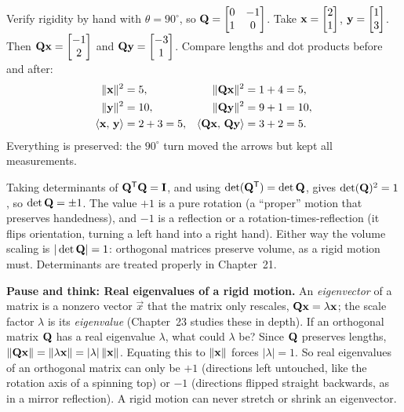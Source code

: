 \begin{labbox}
Verify rigidity by hand with $\theta=90^\circ$, so $\mathbf{Q}=\begin{bmatrix}0&-1\\1&0\end{bmatrix}$.
Take $\mathbf{x}=\begin{bmatrix}2\\1\end{bmatrix}$, $\mathbf{y}=\begin{bmatrix}1\\3\end{bmatrix}$. Then $\mathbf{Q}\mathbf{x}=\begin{bmatrix}-1\\2\end{bmatrix}$ and
$\mathbf{Q}\mathbf{y}=\begin{bmatrix}-3\\1\end{bmatrix}$. Compare lengths and dot products before and after:
\begin{align*}
  \lVert\mathbf{x}\rVert^2 &= 5, & \lVert\mathbf{Q}\mathbf{x}\rVert^2 &= 1+4 = 5,\\
  \lVert\mathbf{y}\rVert^2 &= 10, & \lVert\mathbf{Q}\mathbf{y}\rVert^2 &= 9+1 = 10,\\
  \langle \mathbf{x},\, \mathbf{y} \rangle &= 2+3 = 5, & \langle \mathbf{Q}\mathbf{x},\, \mathbf{Q}\mathbf{y} \rangle &= 3+2 = 5.
\end{align*}
Everything is preserved: the $90^\circ$ turn moved the arrows but kept all measurements.
\end{labbox}

\begin{remark}
Taking determinants of $\mathbf{Q}^{\mathsf{T}}\mathbf{Q}=\mathbf{I}$, and using $\det(\mathbf{Q}^{\mathsf{T}})=\det\mathbf{Q}$, gives
$\det(\mathbf{Q})^2=1$, so $\det\mathbf{Q}=\pm1$.
The value $+1$ is a pure rotation (a ``proper'' motion that preserves handedness), and $-1$ is a
reflection or a rotation-times-reflection (it flips orientation, turning a left hand into a right
hand). Either way the volume scaling is $|\det\mathbf{Q}|=1$: orthogonal matrices preserve volume, as
a rigid motion must. Determinants are treated properly in Chapter~21.
\end{remark}

\begin{recoverybox}
\textbf{Pause and think: Real eigenvalues of a rigid motion.} An \emph{eigenvector} of a matrix is
a nonzero vector $\vec x$ that the matrix only rescales, $\mathbf{Q}\mathbf{x}=\lambda\mathbf{x}$; the scale
factor $\lambda$ is its \emph{eigenvalue} (Chapter~23 studies these in depth). If an orthogonal
matrix $\mathbf{Q}$ has a real eigenvalue $\lambda$, what could $\lambda$ be?
Since $\mathbf{Q}$ preserves lengths, $\lVert\mathbf{Q}\mathbf{x}\rVert = \lVert\lambda \mathbf{x}\rVert = |\lambda|\,\lVert\mathbf{x}\rVert$.
Equating this to $\lVert\mathbf{x}\rVert$ forces $|\lambda|=1$. So real eigenvalues of an orthogonal matrix
can only be $+1$ (directions left untouched, like the rotation axis of a spinning top) or $-1$
(directions flipped straight backwards, as in a mirror reflection). A rigid motion can never stretch
or shrink an eigenvector.
\end{recoverybox}

